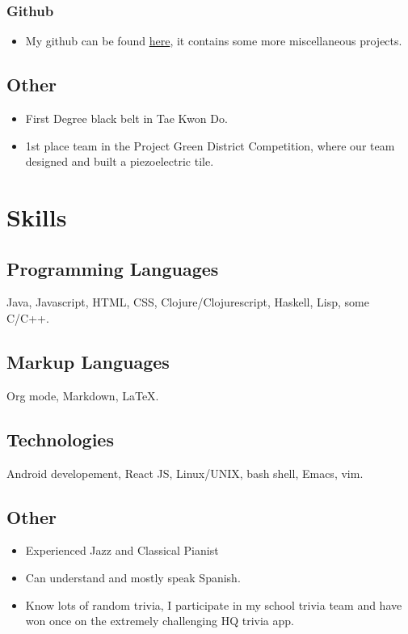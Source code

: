 \documentclass[12pt]{article}
\begin{document}
\subsubsection{Github}
\begin{itemize}
\item My github can be found \href{https://github.com/tkamat}{here}, it contains
  some more miscellaneous projects.
\end{itemize}

\subsection{Other}
\begin{itemize}
\item First Degree black belt in Tae Kwon Do. 
\item 1st place team in the Project Green District Competition, where our team
  designed and built a piezoelectric tile.
\end{itemize}

\section{Skills}
\subsection{Programming Languages}
Java, Javascript, HTML, CSS, Clojure/Clojurescript, Haskell, Lisp, some C/C++.

\subsection{Markup Languages}
Org mode, Markdown, \LaTeX{}.

\subsection{Technologies}
Android developement, React JS, Linux/UNIX, bash shell, Emacs, vim. 

\subsection{Other}
\begin{itemize}
\item Experienced Jazz and Classical Pianist
\item Can understand and mostly speak Spanish.
\item Know lots of random trivia, I participate in my school trivia team and
  have won once on the extremely challenging HQ trivia app.  
\end{itemize}
\end{document}
